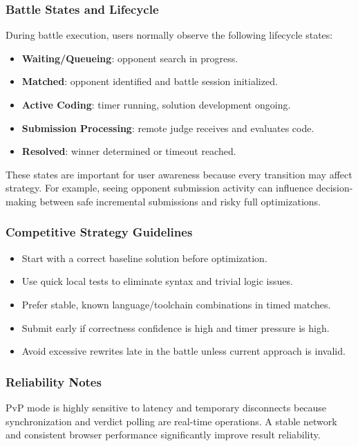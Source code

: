 \documentclass[12pt]{article}
\begin{document}
\subsubsection{Battle States and Lifecycle}

During battle execution, users normally observe the following lifecycle states:
\begin{itemize}
\item \textbf{Waiting/Queueing}: opponent search in progress.
\item \textbf{Matched}: opponent identified and battle session initialized.
\item \textbf{Active Coding}: timer running, solution development ongoing.
\item \textbf{Submission Processing}: remote judge receives and evaluates code.
\item \textbf{Resolved}: winner determined or timeout reached.
\end{itemize}

These states are important for user awareness because every transition may affect strategy. For example, seeing opponent submission activity can influence decision-making between safe incremental submissions and risky full optimizations.

\clearpage
\subsubsection{Competitive Strategy Guidelines}

\begin{itemize}
\item Start with a correct baseline solution before optimization.
\item Use quick local tests to eliminate syntax and trivial logic issues.
\item Prefer stable, known language/toolchain combinations in timed matches.
\item Submit early if correctness confidence is high and timer pressure is high.
\item Avoid excessive rewrites late in the battle unless current approach is invalid.
\end{itemize}

\subsubsection{Reliability Notes}

PvP mode is highly sensitive to latency and temporary disconnects because synchronization and verdict polling are real-time operations. A stable network and consistent browser performance significantly improve result reliability.
\end{document}
